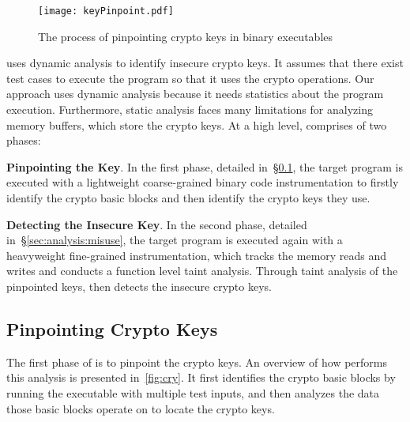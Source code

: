 \begin{figure*}[htbp]
\centering
\texttt{[image: keyPinpoint.pdf]}
\caption{The process of pinpointing crypto keys in binary executables\label{fig:cry} }
\end{figure*}

\sysname uses dynamic analysis to identify insecure crypto keys. 
It assumes that there exist test cases to execute the program so that it uses the crypto operations. Our approach uses dynamic analysis because it needs statistics about the program execution.
Furthermore, static analysis faces many limitations for analyzing memory buffers, which store the crypto keys.
%
At a high level, \sysname comprises of two phases:

\begin{compactitem}

\item \textbf{Pinpointing the Key}. 
In the first phase, detailed in~\S\ref{sec:analysis:pinpoint}, the target program is executed with a lightweight coarse-grained  binary code instrumentation to firstly identify the crypto basic blocks and then identify the crypto keys they use.

\item \textbf{Detecting the Insecure Key}. In the second phase, detailed in~\S\ref{sec:analysis:misuse}, the target program is executed again with a heavyweight  fine-grained  instrumentation, which tracks the memory reads and writes and conducts a function level taint analysis. 
Through taint analysis of the pinpointed keys, \sysname then detects the insecure crypto keys. 

\end{compactitem}


\subsection{Pinpointing Crypto Keys}\label{sec:analysis:pinpoint}

The first phase of \sysname is to pinpoint the crypto keys. 
An overview of how \sysname performs this analysis is presented in~\autoref{fig:cry}. 
It first identifies the crypto basic blocks by running the executable with multiple test inputs, and then analyzes the data those basic blocks operate on to locate the crypto keys. 

